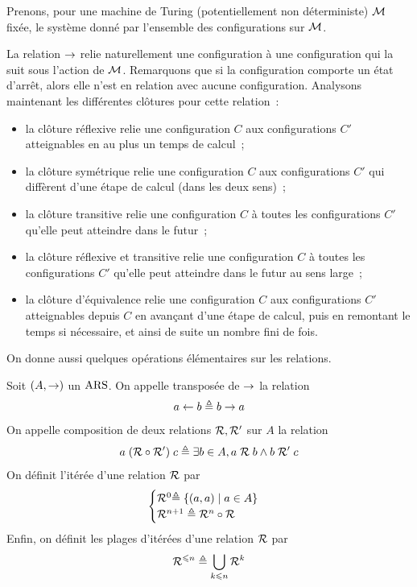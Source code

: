 \begin{example}
  Prenons, pour une machine de Turing (potentiellement non déterministe)
  $\mathcal{M}$ fixée, le système donné par l'ensemble des configurations sur
  $\mathcal{M}$.

  La relation $\mathrel{\to}$ relie naturellement une configuration à une
  configuration qui la suit sous l'action de $\mathcal{M}$. Remarquons que si
  la configuration comporte un état d'arrêt, alors elle n'est en relation avec
  aucune configuration. Analysons maintenant les différentes clôtures pour
  cette relation~:
  \begin{itemize}
  \item la clôture réflexive relie une configuration $C$ aux
    configurations
    $C'$ atteignables en au plus un temps de calcul~;
  \item la clôture symétrique relie une configuration $C$ aux configurations
    $C'$ qui diffèrent d'une étape de calcul (dans les deux sens)~;
  \item la clôture transitive relie une configuration $C$ à toutes les
    configurations $C'$ qu'elle peut atteindre dans le futur~;
  \item la clôture réflexive et transitive relie une configuration $C$ à
    toutes les configurations $C'$ qu'elle peut atteindre dans le futur au sens
    large~;
  \item la clôture d'équivalence relie une configuration $C$ aux configurations
    $C'$ atteignables depuis $C$ en avançant d'une étape de calcul, puis en
    \og remontant le temps\fg{} si nécessaire, et ainsi de suite un nombre fini
    de fois.
  \end{itemize}
\end{example}

\noindent
On donne aussi quelques opérations élémentaires sur les relations.

\begin{definition}[Transposée]
  Soit $(A,\mathrel{\to})$ un $\operatorname{ARS}$. On appelle transposée de $\mathrel{\to}$ la relation
  \[a \mathrel{\leftarrow} b \triangleq b \mathrel{\to} a\]
  On appelle composition de deux relations $\mathrel{\mathcal{R}},\mathrel{\mathcal{R}}'$ sur $A$ la
  relation
  \[a\mathrel{(\mathord{\mathrel{\mathcal{R}}}\circ\mathord{\mathrel{\mathcal{R}}'})}c \triangleq
  \exists b \in A, a \mathrel{\mathcal{R}} b \land b \mathrel{\mathcal{R}}' c\]
  On définit l'itérée d'une relation $\mathrel{\mathcal{R}}$ par
  \[\begin{cases}
  \mathrel{\mathcal{R}}^0 \triangleq \left\{ (a,a) \;\middle\vert\; a \in A \right\}\\
  \mathord{\mathrel{\mathcal{R}}^{n+1}}\triangleq \mathord{\mathrel{\mathcal{R}}^n}\circ\mathord{\mathrel{\mathcal{R}}}
  \end{cases}\]
  Enfin, on définit les plages d'itérées d'une relation $\mathrel{\mathcal{R}}$ par
  \[\mathord{\mathrel{\mathcal{R}}^{\leqslant n}}\triangleq \bigcup_{k \leqslant n} \mathord{\mathrel{\mathcal{R}}^k}\]
\end{definition}

